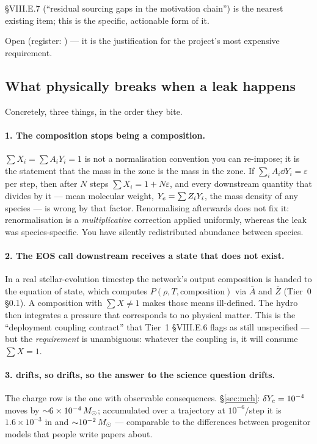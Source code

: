  \S VIII.E.7 (``residual sourcing gaps in the motivation chain'')
is the nearest existing item; this is the specific, actionable form of it.

Open (register: ) --- it is the justification for the project's most
expensive requirement.

\subsection{What physically breaks when a leak happens}
\label{sec:leak}

Concretely, three things, in the order they bite.

\paragraph{1. The composition stops being a composition.}
$\sum X_i = \sum A_i Y_i = 1$ is not a normalisation convention you can
re-impose; it is the statement that the mass in the zone is the mass in the
zone. If $\sum_i A_i \dd Y_i = \varepsilon$ per step, then after $N$ steps
$\sum X_i = 1 + N\varepsilon$, and every downstream quantity that divides by it
--- mean molecular weight, $Y_{e} = \sum Z_i Y_i$, the mass density of any
species --- is wrong by that factor. Renormalising afterwards does not fix it:
renormalisation is a \emph{multiplicative} correction applied uniformly, whereas
the leak was species-specific. You have silently redistributed abundance between
species.

\paragraph{2. The EOS call downstream receives a state that does not exist.}
In a real stellar-evolution timestep the network's output composition is handed
to the equation of state, which computes $P(\rho, T, \text{composition})$ via
$\bar A$ and $\bar Z$ (Tier~0 \S0.1). A composition with $\sum X \neq 1$ makes
those means ill-defined. The hydro then integrates a pressure that corresponds
to no physical matter. This is the ``deployment coupling contract'' that Tier~1
\S VIII.E.6 flags as still unspecified --- but the \emph{requirement} is
unambiguous: whatever the coupling is, it will consume $\sum X = 1$.

\paragraph{3. \Ye{} drifts, so \Mch{} drifts, so the answer to the science
question drifts.} The charge row is the one with observable consequences.
\S\ref{sec:mch}: $\delta Y_{e} = 10^{-4}$ moves \Mch{} by
${\sim}6\times10^{-4}\,M_{\odot}$; accumulated over a trajectory at $10^{-6}$/step
it is $1.6\times10^{-3}$ in \Ye{} and ${\sim}10^{-2}\,M_{\odot}$ --- comparable to
the differences between progenitor models that people write papers about.

